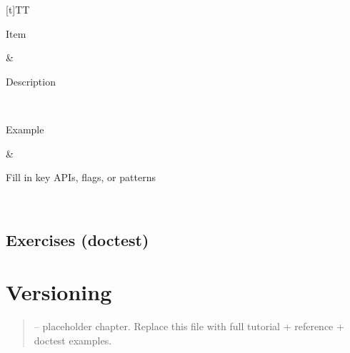 \documentclass[a4paper,11pt,english]{sphinxmanual}
\begin{document}
\begin{savenotes}\sphinxattablestart
\sphinxthistablewithglobalstyle
\centering
\begin{tabulary}{\linewidth}[t]{TT}
\sphinxtoprule
\begin{varwidth}[t]{}
\sphinxstyletheadfamily \sphinxAtStartPar
Item
\sphinxbeforeendvarwidth
\end{varwidth}%
&\begin{varwidth}[t]{}
\sphinxstyletheadfamily \sphinxAtStartPar
Description
\sphinxbeforeendvarwidth
\end{varwidth}%
\\
\sphinxmidrule
\sphinxtableatstartofbodyhook\begin{varwidth}[t]{}
\sphinxAtStartPar
Example
\sphinxbeforeendvarwidth
\end{varwidth}%
&\begin{varwidth}[t]{}
\sphinxAtStartPar
Fill in key APIs, flags, or patterns
\sphinxbeforeendvarwidth
\end{varwidth}%
\\
\sphinxbottomrule
\end{tabulary}
\sphinxtableafterendhook\par
\sphinxattableend\end{savenotes}


\subsection{Exercises (doctest)}
\label{\detokenize{packaging/pyproject_toml:exercises-doctest}}
\begin{sphinxVerbatim}[commandchars=\\\{\}]
\end{sphinxVerbatim}

\sphinxstepscope


\section{Versioning}
\label{\detokenize{packaging/versioning:versioning}}\label{\detokenize{packaging/versioning::doc}}\begin{quote}

\sphinxAtStartPar
{} – placeholder chapter. Replace this file with full tutorial + reference + doctest examples.
\end{quote}
\end{document}
